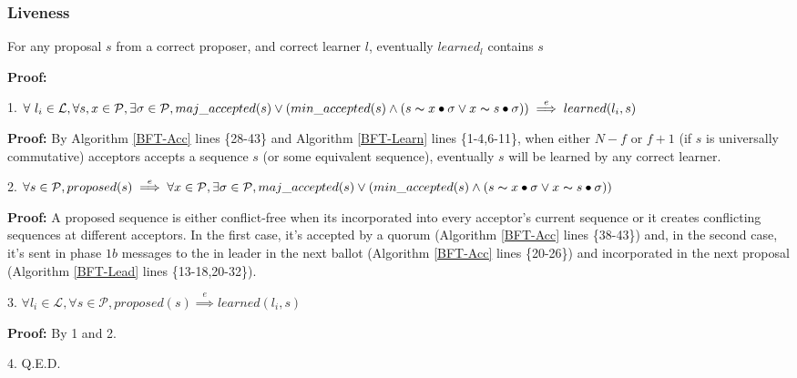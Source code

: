 \subsubsection{Liveness}
\begin{theorem}
For any proposal $s$ from a correct proposer, and correct learner $l$, eventually $learned_l$ contains $s$ \label{L-T1} \par
\end{theorem} 
\parbox{\linewidth}{\textbf{Proof:}} \par
\parbox{\linewidth}{\strut1. $\forall\ l_i \in \mathcal{L},\forall s,x \in \mathcal{P}, \exists \sigma \in \mathcal{P}, maj\_accepted(s) \lor (min\_accepted(s) \land  (s \thicksim x \bullet \sigma \lor x \thicksim s \bullet \sigma))\overset{e}{\implies} learned(l_i,s)$}\par
\indent\indent\parbox{\linewidth}{\strut\textbf{Proof:} By Algorithm \ref{BFT-Acc} lines \{28-43\} and Algorithm \ref{BFT-Learn} lines \{1-4,6-11\}, when either $N-f$ or $f+1$ (if $s$ is universally commutative) acceptors accepts a sequence $s$ (or some equivalent sequence), eventually $s$ will be learned by any correct learner.}\par
\parbox{\linewidth}{\strut2. $\forall s \in \mathcal{P}, proposed(s) \overset{e}{\implies} \forall x \in \mathcal{P}, \exists \sigma \in \mathcal{P}, maj\_accepted(s) \lor (min\_accepted(s) \land  (s \thicksim x \bullet \sigma \lor x \thicksim s \bullet \sigma))$} \par
\indent\indent\parbox{\linewidth}{\strut\textbf{Proof:} A proposed sequence is either conflict-free when its incorporated into every acceptor's current sequence or it creates conflicting sequences at different acceptors. In the first case, it's accepted by a quorum (Algorithm \ref{BFT-Acc} lines \{38-43\}) and, in the second case, it's sent in phase $1b$ messages to the in leader in the next ballot (Algorithm \ref{BFT-Acc} lines \{20-26\}) and incorporated in the next proposal (Algorithm \ref{BFT-Lead} lines \{13-18,20-32\}).} \par
\parbox{\linewidth}{\strut3. $\forall l_i \in \mathcal{L}, \forall s \in \mathcal{P}, proposed(s) \overset{e}{\implies} learned(l_i,s)$} \par
\indent\indent\parbox{\linewidth}{\strut\textbf{Proof:} By 1 and 2.} \par
\parbox{\linewidth}{\strut4. Q.E.D.}